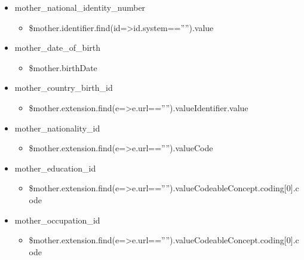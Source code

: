 \documentclass[letterpaper,10pt,english]{sphinxmanual}
\begin{document}
\begin{itemize}
\begin{itemize}
\end{itemize}

\item {} 
\sphinxAtStartPar
mother\_national\_identity\_number
\begin{itemize}
\item {} 
\sphinxAtStartPar
\$mother.identifier.find(id=\textgreater{}id.system==””).value

\end{itemize}

\item {} 
\sphinxAtStartPar
mother\_date\_of\_birth
\begin{itemize}
\item {} 
\sphinxAtStartPar
\$mother.birthDate

\end{itemize}

\item {} 
\sphinxAtStartPar
mother\_country\_birth\_id
\begin{itemize}
\item {} 
\sphinxAtStartPar
\$mother.extension.find(e=\textgreater{}e.url==””).valueIdentifier.value

\end{itemize}

\item {} 
\sphinxAtStartPar
mother\_nationality\_id
\begin{itemize}
\item {} 
\sphinxAtStartPar
\$mother.extension.find(e=\textgreater{}e.url==””).valueCode

\end{itemize}

\item {} 
\sphinxAtStartPar
mother\_education\_id
\begin{itemize}
\item {} 
\sphinxAtStartPar
\$mother.extension.find(e=\textgreater{}e.url==””).valueCodeableConcept.coding{[}0{]}.code

\end{itemize}

\item {} 
\sphinxAtStartPar
mother\_occupation\_id
\begin{itemize}
\item {} 
\sphinxAtStartPar
\$mother.extension.find(e=\textgreater{}e.url==””).valueCodeableConcept.coding{[}0{]}.code


\end{itemize}
\end{itemize}
\end{document}
